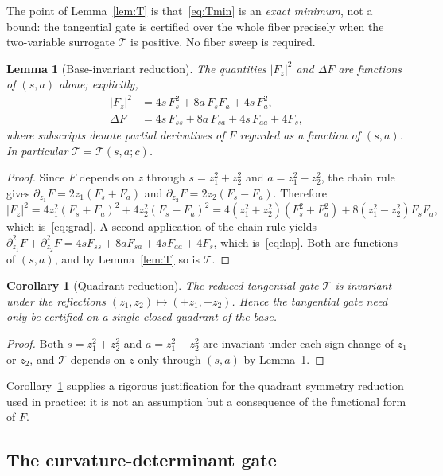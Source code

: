 \documentclass[11pt,reqno]{amsart}
\theoremstyle{plain}
\newtheorem{lemma}[theorem]{Lemma}
\newtheorem{corollary}[theorem]{Corollary}
\theoremstyle{definition}
\newcommand{\calT}{\mathcal{T}}
\newcommand{\Fz}{F_{z}}
\begin{document}
The point of Lemma~\ref{lem:T} is that~\eqref{eq:Tmin} is an \emph{exact minimum}, not a bound: the tangential gate is certified over the whole fiber precisely when the two-variable surrogate $\calT$ is positive. No fiber sweep is required.

\begin{lemma}[Base-invariant reduction]\label{lem:sa}
The quantities $|\Fz|^2$ and $\Delta F$ are functions of $(s,a)$ alone; explicitly,
\begin{align}
|\Fz|^2&=4s\,F_s^2+8a\,F_sF_a+4s\,F_a^2,\label{eq:grad}\\
\Delta F&=4s\,F_{ss}+8a\,F_{sa}+4s\,F_{aa}+4F_s,\label{eq:lap}
\end{align}
where subscripts denote partial derivatives of $F$ regarded as a function of $(s,a)$. In particular $\calT=\calT(s,a;c)$.
\end{lemma}

\begin{proof}
Since $F$ depends on $z$ through $s=z_1^2+z_2^2$ and $a=z_1^2-z_2^2$, the chain rule gives $\partial_{z_1}F=2z_1(F_s+F_a)$ and $\partial_{z_2}F=2z_2(F_s-F_a)$. Therefore
\[
|\Fz|^2=4z_1^2(F_s+F_a)^2+4z_2^2(F_s-F_a)^2
=4(z_1^2+z_2^2)(F_s^2+F_a^2)+8(z_1^2-z_2^2)F_sF_a,
\]
which is~\eqref{eq:grad}. A second application of the chain rule yields $\partial_{z_1}^2F+\partial_{z_2}^2F=4sF_{ss}+8aF_{sa}+4sF_{aa}+4F_s$, which is~\eqref{eq:lap}. Both are functions of $(s,a)$, and by Lemma~\ref{lem:T} so is $\calT$.
\end{proof}

\begin{corollary}[Quadrant reduction]\label{cor:quad}
The reduced tangential gate $\calT$ is invariant under the reflections $(z_1,z_2)\mapsto(\pm z_1,\pm z_2)$. Hence the tangential gate need only be certified on a single closed quadrant of the base.
\end{corollary}

\begin{proof}
Both $s=z_1^2+z_2^2$ and $a=z_1^2-z_2^2$ are invariant under each sign change of $z_1$ or $z_2$, and $\calT$ depends on $z$ only through $(s,a)$ by Lemma~\ref{lem:sa}.
\end{proof}

Corollary~\ref{cor:quad} supplies a rigorous justification for the quadrant symmetry reduction used in practice: it is not an assumption but a consequence of the functional form of $F$.

\subsection{The curvature-determinant gate}
\end{document}
